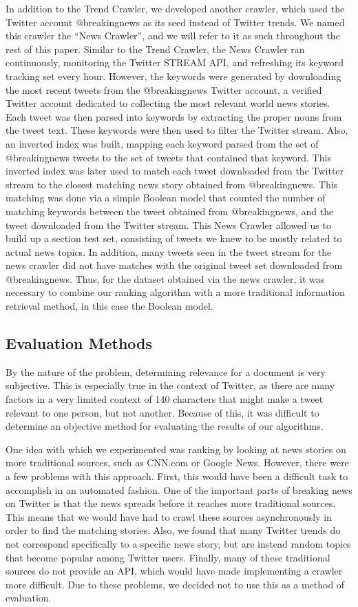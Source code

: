 \documentclass[10pt]{proc}
\begin{document}
  In addition to the Trend Crawler, we developed another crawler, which used the Twitter account @breakingnews as its seed instead of Twitter trends. We named this crawler the ``News Crawler'', and we will refer to it as such throughout the rest of this paper. Similar to the Trend Crawler, the News Crawler ran continuously, monitoring the Twitter STREAM API, and refreshing its keyword tracking set every hour. However, the keywords were generated by downloading the most recent tweets from the @breakingnews Twitter account, a verified Twitter account dedicated to collecting the most relevant world news stories. Each tweet was then parsed into keywords by extracting the proper nouns from the tweet text. These keywords were then used to filter the Twitter stream. Also, an inverted index was built, mapping each keyword parsed from the set of @breakingnews tweets to the set of tweets that contained that keyword. This inverted index was later used to match each tweet downloaded from the Twitter stream to the closest matching news story obtained from @breakingnews. This matching was done via a simple Boolean model that counted the number of matching keywords between the tweet obtained from @breakingnews, and the tweet downloaded from the Twitter stream. This News Crawler allowed us to build up a section test set, consisting of tweets we knew to be mostly related to actual news topics. In addition, many tweets seen in the tweet stream for the news crawler did not have matches with the original tweet set downloaded from @breakingnews. Thus, for the dataset obtained via the news crawler, it was necessary to combine our ranking algorithm with a more traditional information retrieval method, in this case the Boolean model.

  \subsection{Evaluation Methods}
  By the nature of the problem, determining relevance for a document is very subjective. This is especially true in the context of Twitter, as there are many factors in a very limited context of 140 characters that might make a tweet relevant to one person, but not another. Because of this, it was difficult to determine an objective method for evaluating the results of our algorithms.

  One idea with which we experimented was ranking by looking at news stories on more traditional sources, such as CNN.com or Google News. However, there were a few problems with this approach. First, this would have been a difficult task to accomplish in an automated fashion. One of the important parts of breaking news on Twitter is that the news spreads before it reaches more traditional sources. This means that we would have had to crawl these sources asynchronously in order to find the matching stories. Also, we found that many Twitter trends do not correspond specifically to a specific news story, but are instead random topics that become popular among Twitter users. Finally, many of these traditional sources do not provide an API, which would have made implementing a crawler more difficult. Due to these problems, we decided not to use this as a method of evaluation.
\end{document}
